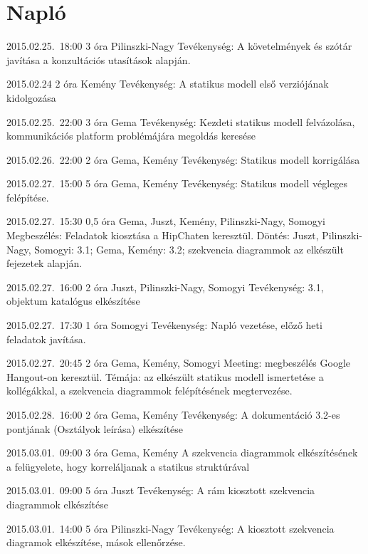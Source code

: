 %
\section{Napló}

\begin{naplo}

\bejegyzes
{2015.02.25.~18:00} %
{3 óra} %
{Pilinszki-Nagy} %
{Tevékenység: A követelmények és szótár javítása a konzultációs utasítások alapján.} %

\bejegyzes
{2015.02.24}
{2 óra}
{Kemény}
{Tevékenység: A statikus modell első verziójának kidolgozása}

\bejegyzes
{2015.02.25.~22:00}
{3 óra}
{Gema}
{Tevékenység: Kezdeti statikus modell felvázolása, kommunikációs platform problémájára megoldás keresése}

\bejegyzes
{2015.02.26.~22:00}
{2 óra}
{Gema, Kemény}
{Tevékenység: Statikus modell korrigálása}

\bejegyzes
{2015.02.27.~15:00} %
{5 óra} %
{Gema, Kemény} %
{Tevékenység: Statikus modell végleges felépítése.} %

\bejegyzes
{2015.02.27.~15:30} %
{0,5 óra} %
{Gema, Juszt, Kemény, Pilinszki-Nagy, Somogyi} %
{Megbeszélés: Feladatok kiosztása a HipChaten keresztül. Döntés: Juszt, Pilinszki-Nagy, Somogyi: 3.1; Gema, Kemény: 3.2; szekvencia diagrammok az elkészült fejezetek alapján.} %

\bejegyzes
{2015.02.27.~16:00} %
{2 óra} %
{Juszt, Pilinszki-Nagy, Somogyi} %
{Tevékenység: 3.1, objektum katalógus elkészítése} %

\bejegyzes
{2015.02.27.~17:30} %
{1 óra} %
{Somogyi} %
{Tevékenység: Napló vezetése, előző heti feladatok javítása.} %

\bejegyzes
{2015.02.27.~20:45} %
{2 óra} %
{Gema, Kemény, Somogyi} %
{Meeting: megbeszélés Google Hangout-on keresztül. Témája: az elkészült statikus modell ismertetése a kollégákkal, a szekvencia diagrammok felépítésének megtervezése.} %

\bejegyzes
{2015.02.28.~16:00}
{2 óra}
{Gema, Kemény}
{Tevékenység: A dokumentáció 3.2-es pontjának (Osztályok leírása) elkészítése}

\bejegyzes
{2015.03.01.~09:00}
{3 óra}
{Gema, Kemény}
{A szekvencia diagrammok elkészítésének a felügyelete, hogy korreláljanak a statikus struktúrával }

\bejegyzes
{2015.03.01.~09:00}
{5 óra}
{Juszt}
{Tevékenység: A rám kiosztott szekvencia diagrammok elkészítése}

\bejegyzes
{2015.03.01.~14:00}
{5 óra}
{Pilinszki-Nagy}
{Tevékenység: A kiosztott szekvencia diagramok elkészítése, mások ellenőrzése.}

\end{naplo}

